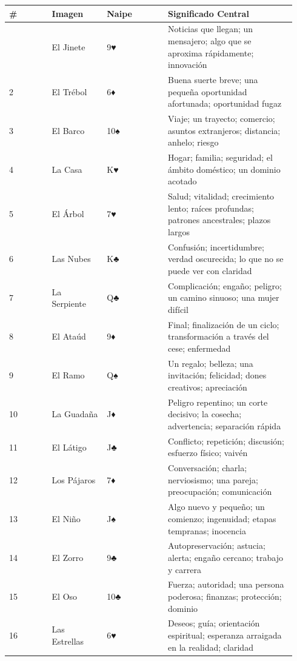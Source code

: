 \begin{longtable}[]{@{}>{\RaggedRight\small}p{0.14\linewidth}>{\RaggedRight\small}p{0.18\linewidth}>{\RaggedRight\small}p{0.20\linewidth}>{\RaggedRight\small}p{0.42\linewidth}@{}}
\toprule\noalign{}
\# & Imagen & Naipe & Significado Central \\
\midrule\noalign{}
\endhead
\bottomrule\noalign{}
\endlastfoot
1 & El Jinete & 9♥ & Noticias que llegan; un mensajero; algo que se aproxima rápidamente; innovación \\
2 & El Trébol & 6♦ & Buena suerte breve; una pequeña oportunidad afortunada; oportunidad fugaz \\
3 & El Barco & 10♠ & Viaje; un trayecto; comercio; asuntos extranjeros; distancia; anhelo; riesgo \\
4 & La Casa & K♥ & Hogar; familia; seguridad; el ámbito doméstico; un dominio acotado \\
5 & El Árbol & 7♥ & Salud; vitalidad; crecimiento lento; raíces profundas; patrones ancestrales; plazos largos \\
6 & Las Nubes & K♣ & Confusión; incertidumbre; verdad oscurecida; lo que no se puede ver con claridad \\
7 & La Serpiente & Q♣ & Complicación; engaño; peligro; un camino sinuoso; una mujer difícil \\
8 & El Ataúd & 9♦ & Final; finalización de un ciclo; transformación a través del cese; enfermedad \\
9 & El Ramo & Q♠ & Un regalo; belleza; una invitación; felicidad; dones creativos; apreciación \\
10 & La Guadaña & J♦ & Peligro repentino; un corte decisivo; la cosecha; advertencia; separación rápida \\
11 & El Látigo & J♣ & Conflicto; repetición; discusión; esfuerzo físico; vaivén \\
12 & Los Pájaros & 7♦ & Conversación; charla; nerviosismo; una pareja; preocupación; comunicación \\
13 & El Niño & J♠ & Algo nuevo y pequeño; un comienzo; ingenuidad; etapas tempranas; inocencia \\
14 & El Zorro & 9♣ & Autopreservación; astucia; alerta; engaño cercano; trabajo y carrera \\
15 & El Oso & 10♣ & Fuerza; autoridad; una persona poderosa; finanzas; protección; dominio \\
16 & Las Estrellas & 6♥ & Deseos; guía; orientación espiritual; esperanza arraigada en la realidad; claridad \\

\end{longtable}
